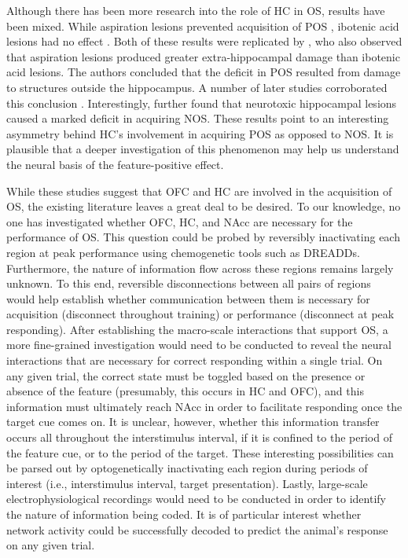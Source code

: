 \documentclass[11pt]{article}
\let\cite=\citep
\let\citeN=\citet
\begin{document}
Although there has been more research into the role of HC in OS, results have 
been mixed. While aspiration lesions prevented acquisition of POS 
\cite{Ross1984}, ibotenic acid lesions had no effect \cite{Jarrard1990}. Both 
of these results were replicated by \citeN{Jarrard1991}, who also observed that 
aspiration lesions produced greater extra-hippocampal damage than ibotenic acid 
lesions. The authors concluded that the deficit in POS resulted from damage to 
structures outside the hippocampus. A number of later studies corroborated this 
conclusion \cite{Moreira2003,Holland1999}. Interestingly, \citeN{Holland1999} 
further found that neurotoxic hippocampal lesions caused a marked deficit in 
acquiring NOS. These results point to an interesting asymmetry behind HC's 
involvement in acquiring POS as opposed to NOS. It is plausible that a deeper 
investigation of this phenomenon may help us understand the neural basis of the 
feature-positive effect.

While these studies suggest that OFC and HC are involved in the acquisition of 
OS, the existing literature leaves a great deal to be desired. To our 
knowledge, no one has investigated whether OFC, HC, and NAcc are necessary for 
the performance of OS. This question could be probed by reversibly inactivating 
each region at peak performance using chemogenetic tools such as DREADDs. 
Furthermore, the nature of information flow across these regions remains 
largely unknown. To this end, reversible disconnections between all pairs of 
regions would help establish whether communication between them is necessary 
for acquisition (disconnect throughout training) or performance (disconnect at 
peak responding). After establishing the macro-scale interactions that support 
OS, a more fine-grained investigation would need to be conducted to reveal the 
neural interactions that are necessary for correct responding within a single 
trial. On any given trial, the correct state must be toggled based on the 
presence or absence of the feature (presumably, this occurs in HC and OFC), and 
this information must ultimately reach NAcc in order to facilitate responding 
once the target cue comes on. It is unclear, however, whether this information 
transfer occurs all throughout the interstimulus interval, if it is confined to 
the period of the feature cue, or to the period of the target. These 
interesting possibilities can be parsed out by optogenetically inactivating 
each region during periods of interest (i.e., interstimulus interval, target 
presentation). Lastly, large-scale electrophysiological recordings would need 
to be conducted in order to identify the nature of information being coded. It 
is of particular interest whether network activity could be successfully 
decoded to predict the animal's response on any given trial. 
\end{document}
